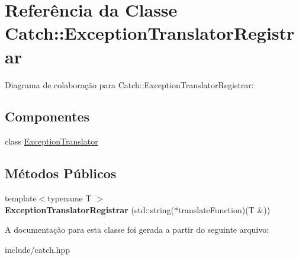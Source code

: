 \hypertarget{classCatch_1_1ExceptionTranslatorRegistrar}{}\section{Referência da Classe Catch\+:\+:Exception\+Translator\+Registrar}
\label{classCatch_1_1ExceptionTranslatorRegistrar}


Diagrama de colaboração para Catch\+:\+:Exception\+Translator\+Registrar\+:
\subsection*{Componentes}
\begin{DoxyCompactItemize}
\item 
class \hyperlink{classCatch_1_1ExceptionTranslatorRegistrar_1_1ExceptionTranslator}{Exception\+Translator}
\end{DoxyCompactItemize}
\subsection*{Métodos Públicos}
\begin{DoxyCompactItemize}
\item 
{\footnotesize template$<$typename T $>$ }\\{\bfseries Exception\+Translator\+Registrar} (std\+::string($\ast$translate\+Function)(T \&))\hypertarget{classCatch_1_1ExceptionTranslatorRegistrar_aa73229de911f26b1df6c6c87c4d9e04e}{}\label{classCatch_1_1ExceptionTranslatorRegistrar_aa73229de911f26b1df6c6c87c4d9e04e}

\end{DoxyCompactItemize}


A documentação para esta classe foi gerada a partir do seguinte arquivo\+:\begin{DoxyCompactItemize}
\item 
include/catch.\+hpp\end{DoxyCompactItemize}
